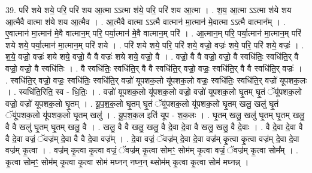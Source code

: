 \documentclass[17pt]{extarticle}
\begin{document}
39. परि॑ शये शये॒ परि॒ परि॑ शय आ॒त्मा ऽऽत्मा श॑ये॒ परि॒ परि॑ शय आ॒त्मा । . श॒य॒ आ॒त्मा ऽऽत्मा श॑ये शय आ॒त्मैवै वात्मा श॑ये शय आ॒त्मैव । . आ॒त्मैवै वात्मा ऽऽत्मै वात्मान॑ मा॒त्मान॑ मे॒वात्मा ऽऽत्मै वात्मान᳚म् । . ए॒वात्मान॑ मा॒त्मान॑ मे॒वै वात्मान॒म् परि॒ पर्या॒त्मान॑ मे॒वै वात्मान॒म् परि॑ । . आ॒त्मान॒म् परि॒ पर्या॒त्मान॑ मा॒त्मान॒म् परि॑ शये शये॒ पर्या॒त्मान॑ मा॒त्मान॒म् परि॑ शये । . परि॑ शये शये॒ परि॒ परि॑ शये॒ वज्रो॒ वज्रः॑ शये॒ परि॒ परि॑ शये॒ वज्रः॑ । . श॒ये॒ वज्रो॒ वज्रः॑ शये शये॒ वज्रो॒ वै वै वज्रः॑ शये शये॒ वज्रो॒ वै । . वज्रो॒ वै वै वज्रो॒ वज्रो॒ वै स्वधि॑तिः॒ स्वधि॑ति॒र् वै वज्रो॒ वज्रो॒ वै स्वधि॑तिः । . वै स्वधि॑तिः॒ स्वधि॑ति॒र् वै वै स्वधि॑ति॒र् वज्रो॒ वज्रः॒ स्वधि॑ति॒र् वै वै स्वधि॑ति॒र् वज्रः॑ । . स्वधि॑ति॒र् वज्रो॒ वज्रः॒ स्वधि॑तिः॒ स्वधि॑ति॒र् वज्रो॑ यूपशक॒लो यू॑पशक॒लो वज्रः॒ स्वधि॑तिः॒ स्वधि॑ति॒र् वज्रो॑ यूपशक॒लः । . स्वधि॑ति॒रिति॒ स्व - धि॒तिः॒ । . वज्रो॑ यूपशक॒लो यू॑पशक॒लो वज्रो॒ वज्रो॑ यूपशक॒लो घृ॒तम् घृ॒तं ॅयू॑पशक॒लो वज्रो॒ वज्रो॑ यूपशक॒लो घृ॒तम् । . यू॒प॒श॒क॒लो घृ॒तम् घृ॒तं ॅयू॑पशक॒लो यू॑पशक॒लो घृ॒तम् खलु॒ खलु॑ घृ॒तं ॅयू॑पशक॒लो यू॑पशक॒लो घृ॒तम् खलु॑ । . यू॒प॒श॒क॒ल इति॑ यूप - श॒क॒लः । . घृ॒तम् खलु॒ खलु॑ घृ॒तम् घृ॒तम् खलु॒ वै वै खलु॑ घृ॒तम् घृ॒तम् खलु॒ वै । . खलु॒ वै वै खलु॒ खलु॒ वै दे॒वा दे॒वा वै खलु॒ खलु॒ वै दे॒वाः । . वै दे॒वा दे॒वा वै वै दे॒वा वज्रं॒ ॅवज्र॑म् दे॒वा वै वै दे॒वा वज्र᳚म् । . दे॒वा वज्रं॒ ॅवज्र॑म् दे॒वा दे॒वा वज्र॑म् कृ॒त्वा कृ॒त्वा वज्र॑म् दे॒वा दे॒वा वज्र॑म् कृ॒त्वा । . वज्र॑म् कृ॒त्वा कृ॒त्वा वज्रं॒ ॅवज्र॑म् कृ॒त्वा सोमꣳ॒॒ सोम॑म् कृ॒त्वा वज्रं॒ ॅवज्र॑म् कृ॒त्वा सोम᳚म् । . कृ॒त्वा सोमꣳ॒॒ सोम॑म् कृ॒त्वा कृ॒त्वा सोम॑ मघ्नन् नघ्न॒न् थ्सोम॑म् कृ॒त्वा कृ॒त्वा सोम॑ मघ्नन्न् । \newline
\end{document}
